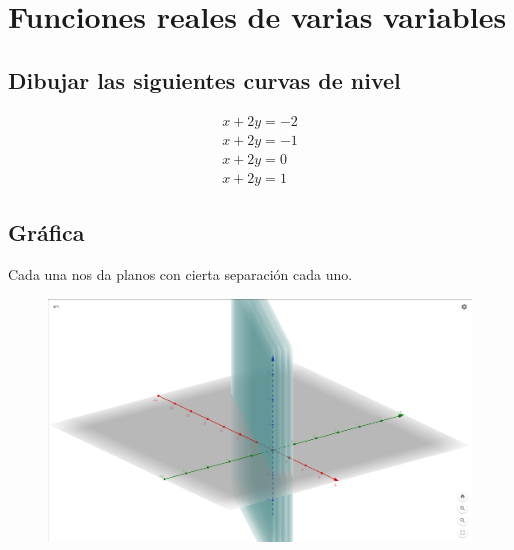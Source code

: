 \documentclass[letterpaper, 12pt]{article}
\begin{document}
\setcounter{page}{1}
\thispagestyle{fancy}
\section*{Funciones reales de varias variables}
\subsection*{Dibujar las siguientes curvas de nivel}
\[\begin{matrix}
    x+2y=-2\\
    x+2y=-1\\
    x+2y=0\\
    x+2y=1
\end{matrix}\]
\subsection*{Gráfica}
Cada una nos da planos con cierta separación cada uno.
\begin{figure}[H]
    \centering
    \includegraphics[width=12cm]{grafica.PNG}
\end{figure}
\end{document}
